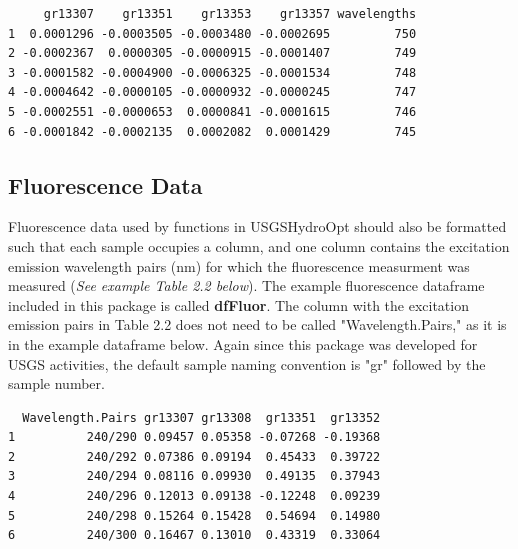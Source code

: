 \documentclass[a4paper,11pt]{article}\usepackage[]{graphicx}\usepackage[]{color}
\makeatletter
\newenvironment{kframe}{%
 \def\at@end@of@kframe{}%
 \ifinner\ifhmode%
  \def\at@end@of@kframe{\end{minipage}}%
  \begin{minipage}{\columnwidth}%
 \fi\fi%
 \def\FrameCommand##1{\hskip\@totalleftmargin \hskip-\fboxsep
 \colorbox{shadecolor}{##1}\hskip-\fboxsep
     \hskip-\linewidth \hskip-\@totalleftmargin \hskip\columnwidth}%
 \MakeFramed {\advance\hsize-\width
   \@totalleftmargin\z@ \linewidth\hsize
   \@setminipage}}%
 {\par\unskip\endMakeFramed%
 \at@end@of@kframe}
\newenvironment{knitrout}{}{} %
\makeatother
\begin{document}
\begin{knitrout}
\color{fgcolor}\begin{kframe}
\begin{verbatim}
     gr13307    gr13351    gr13353    gr13357 wavelengths
1  0.0001296 -0.0003505 -0.0003480 -0.0002695         750
2 -0.0002367  0.0000305 -0.0000915 -0.0001407         749
3 -0.0001582 -0.0004900 -0.0006325 -0.0001534         748
4 -0.0004642 -0.0000105 -0.0000932 -0.0000245         747
5 -0.0002551 -0.0000653  0.0000841 -0.0001615         746
6 -0.0001842 -0.0002135  0.0002082  0.0001429         745
\end{verbatim}
\end{kframe}
\end{knitrout}

\subsection{Fluorescence Data}
Fluorescence data used by functions in USGSHydroOpt should also be formatted such that each sample occupies a column, and one column contains the excitation emission wavelength pairs (nm) for which the fluorescence measurment was measured (\emph{See example Table 2.2 below}). The example fluorescence dataframe included in this package is called \textbf{dfFluor}. The column with the excitation emission pairs in Table 2.2 does not need to be called "Wavelength.Pairs," as it is in the example dataframe below. Again since this package was developed for USGS activities, the default sample naming convention is "gr" followed by the sample number.

\begin{knitrout}
\color{fgcolor}\begin{kframe}
\begin{verbatim}
  Wavelength.Pairs gr13307 gr13308  gr13351  gr13352
1          240/290 0.09457 0.05358 -0.07268 -0.19368
2          240/292 0.07386 0.09194  0.45433  0.39722
3          240/294 0.08116 0.09930  0.49135  0.37943
4          240/296 0.12013 0.09138 -0.12248  0.09239
5          240/298 0.15264 0.15428  0.54694  0.14980
6          240/300 0.16467 0.13010  0.43319  0.33064
\end{verbatim}
\end{kframe}
\end{knitrout}
\end{document}
